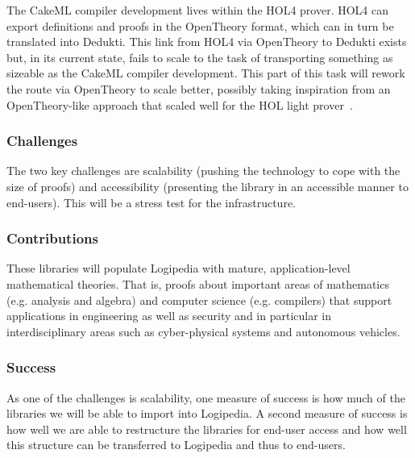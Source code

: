 The CakeML
compiler development lives within the HOL4 prover. HOL4 can export
definitions and proofs in the OpenTheory format, which can in turn be
translated into Dedukti. This link from HOL4 via OpenTheory to Dedukti
exists but, in its current state, fails to scale to the task of
transporting something as sizeable as the CakeML compiler
development. This part of this task will rework the route via
OpenTheory to scale better, possibly taking inspiration from an
OpenTheory-like approach that scaled well for the HOL light
prover~\cite{KaliszykK13}.


\subsubsection*{Challenges}

The two key challenges are scalability (pushing the technology to cope
with the size of proofs) and accessibility (presenting the library in
an accessible manner to end-users). This will be a stress test for the
infrastructure.

\subsubsection*{Contributions}

These libraries will populate Logipedia with mature,
application-level mathematical theories. That is, proofs about
important areas of mathematics (e.g. analysis and algebra) and
computer science (e.g. compilers) that support applications in
engineering as well as security and in particular in interdisciplinary
areas such as cyber-physical systems and autonomous vehicles.

\subsubsection*{Success}

As one of the challenges is scalability, one measure of success is how
much of the libraries we will be able to import into Logipedia. A
second measure of success is how well we are able to restructure the
libraries for end-user access and how well this structure can be
transferred to Logipedia and thus to end-users.

